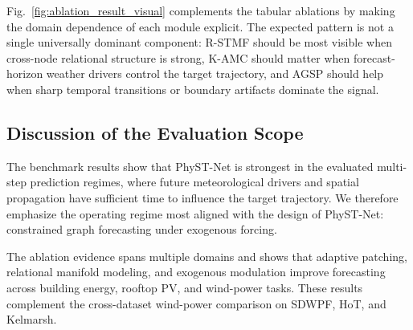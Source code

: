 Fig.~\ref{fig:ablation_result_visual} complements the tabular ablations by making the domain dependence of each module explicit. The expected pattern is not a single universally dominant component: R-STMF should be most visible when cross-node relational structure is strong, K-AMC should matter when forecast-horizon weather drivers control the target trajectory, and AGSP should help when sharp temporal transitions or boundary artifacts dominate the signal.

\subsection{Discussion of the Evaluation Scope}
\label{sec:evaluation_scope}

The benchmark results show that PhyST-Net is strongest in the evaluated multi-step prediction regimes, where future meteorological drivers and spatial propagation have sufficient time to influence the target trajectory. We therefore emphasize the operating regime most aligned with the design of PhyST-Net: constrained graph forecasting under exogenous forcing.

The ablation evidence spans multiple domains and shows that adaptive patching, relational manifold modeling, and exogenous modulation improve forecasting across building energy, rooftop PV, and wind-power tasks. These results complement the cross-dataset wind-power comparison on SDWPF, HoT, and Kelmarsh.
